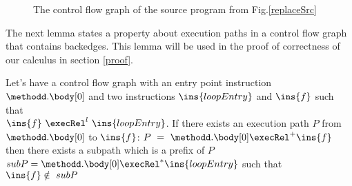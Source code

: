 \begin{figure}[ht!]
\begin{center}
\caption{The control flow graph of the source program from Fig.\ref{replaceSrc} }
\label{ctrlflow}
\end{center}
\end{figure}

The next lemma states a property about execution paths in a control flow graph that contains backedges. This lemma will be used in the proof of correctness
of our calculus in section \ref{proof}.
\begin{propPath} \label{propPath}
 Let's have a control flow graph with an entry point instruction $\methodd.\body[0]$ and two instructions $\ins{loopEntry}$ and  
 $\ins{f}$ such that  \\
 $\ins{f}~\execRel^l~\ins{loopEntry}$. If there exists an execution path $P$ from $\methodd.\body[0]$ to  $\ins{f}$:   $P~=~\methodd.\body[0] \execRel^{+} \ins{f}$
 then there exists a subpath which is a prefix of $P$  $subP = \methodd.\body[0] \execRel^{*} \ins{loopEntry}$ such that $\ins{f} \notin  \ subP  $ 
 \end{propPath} 







